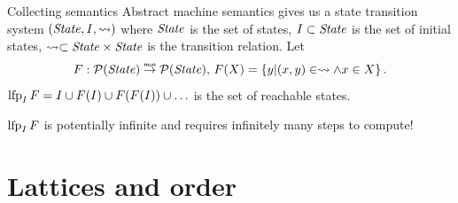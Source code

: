 \documentclass[aspectratio=169,14pt]{beamer}
\begin{document}
\begin{frame}{Collecting semantics}
  Abstract machine semantics gives us a state transition system $(\mathit{State}, I, \rightsquigarrow)$ where \pause $\mathit{State}$ is the set of states, \pause $I \subset \mathit{State}$ is the set of initial states, \pause $\rightsquigarrow \subset \mathit{State} \times \mathit{State}$ is the transition relation. \pause Let
  \[ F : \pw(\State) \monarrow \pw(\State),\, F(X) = \Set{y \vert (x, y) \in \step \wedge x \in X}. \]\pause
  $\operatorname{lfp}_I F = I \cup F(I) \cup F(F(I)) \cup \ldots $ is the set of reachable states.\pause

  \alert{$\operatorname{lfp}_I F$ is potentially infinite and requires infinitely many steps to compute!}
\end{frame}

\section{Lattices and order}
\end{document}
